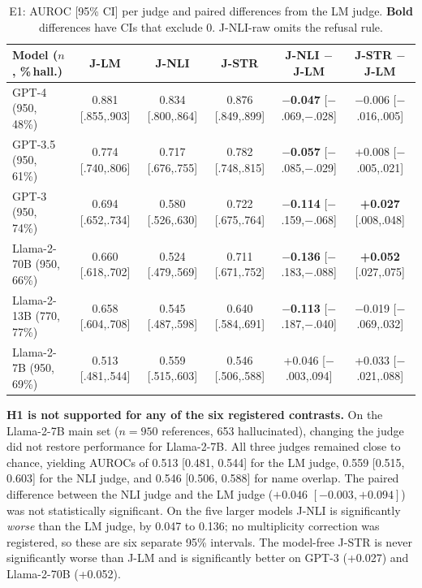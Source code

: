 \documentclass[acmsmall,screen]{acmart}
\begin{document}
\begin{table}[t]
\caption{E1: AUROC [95\% CI] per judge and paired differences from the LM judge. \textbf{Bold} differences have CIs that exclude 0. J-NLI-raw omits the refusal rule.}
\label{tab:e1}
\footnotesize
\setlength{\tabcolsep}{2.5pt}
\begin{tabular}{lccccc}
\toprule
Model ($n$, \%\,hall.) & J-LM & J-NLI & J-STR & J-NLI $-$ J-LM & J-STR $-$ J-LM \\
\midrule
GPT-4 (950, 48\%) & 0.881 [.855,.903] & 0.834 [.800,.864] & 0.876 [.849,.899] & \textbf{$-$0.047} [$-$.069,$-$.028] & $-$0.006 [$-$.016,.005] \\
GPT-3.5 (950, 61\%) & 0.774 [.740,.806] & 0.717 [.676,.755] & 0.782 [.748,.815] & \textbf{$-$0.057} [$-$.085,$-$.029] & +0.008 [$-$.005,.021] \\
GPT-3 (950, 74\%) & 0.694 [.652,.734] & 0.580 [.526,.630] & 0.722 [.675,.764] & \textbf{$-$0.114} [$-$.159,$-$.068] & \textbf{+0.027} [.008,.048] \\
Llama-2-70B (950, 66\%) & 0.660 [.618,.702] & 0.524 [.479,.569] & 0.711 [.671,.752] & \textbf{$-$0.136} [$-$.183,$-$.088] & \textbf{+0.052} [.027,.075] \\
Llama-2-13B (770, 77\%) & 0.658 [.604,.708] & 0.545 [.487,.598] & 0.640 [.584,.691] & \textbf{$-$0.113} [$-$.187,$-$.040] & $-$0.019 [$-$.069,.032] \\
Llama-2-7B (950, 69\%) & 0.513 [.481,.544] & 0.559 [.515,.603] & 0.546 [.506,.588] & +0.046 [$-$.003,.094] & +0.033 [$-$.021,.088] \\
\bottomrule
\end{tabular}
\end{table}

\textbf{H1 is not supported for any of the six registered contrasts.} On the Llama-2-7B main set ($n = 950$ references, 653 hallucinated), changing the judge did not restore performance for Llama-2-7B. All three judges remained close to chance, yielding AUROCs of 0.513 [0.481, 0.544] for the LM judge, 0.559 [0.515, 0.603] for the NLI judge, and 0.546 [0.506, 0.588] for name overlap. The paired difference between the NLI judge and the LM judge ($+0.046$ $[-0.003, +0.094]$) was not statistically significant. On the five larger models J-NLI is significantly \emph{worse} than the LM judge, by 0.047 to 0.136; no multiplicity correction was registered, so these are six separate 95\% intervals. The model-free J-STR is never significantly worse than J-LM and is significantly better on GPT-3 (+0.027) and Llama-2-70B (+0.052).
\end{document}
